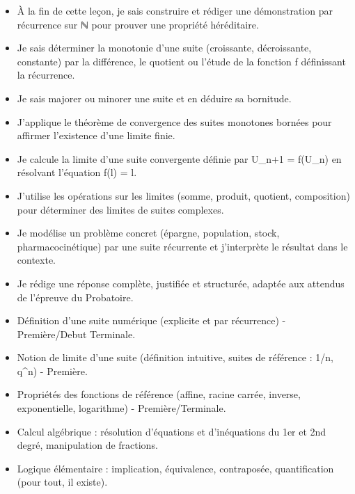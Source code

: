 \documentclass[11pt]{article}
\begin{document}
\begin{objectifs}
\begin{itemize}
\item À la fin de cette leçon, je sais construire et rédiger une démonstration par récurrence sur ℕ pour prouver une propriété héréditaire.
\item Je sais déterminer la monotonie d'une suite (croissante, décroissante, constante) par la différence, le quotient ou l'étude de la fonction f définissant la récurrence.
\item Je sais majorer ou minorer une suite et en déduire sa bornitude.
\item J'applique le théorème de convergence des suites monotones bornées pour affirmer l'existence d'une limite finie.
\item Je calcule la limite d'une suite convergente définie par U\_{n+1} = f(U\_n) en résolvant l'équation f(l) = l.
\item J'utilise les opérations sur les limites (somme, produit, quotient, composition) pour déterminer des limites de suites complexes.
\item Je modélise un problème concret (épargne, population, stock, pharmacocinétique) par une suite récurrente et j'interprète le résultat dans le contexte.
\item Je rédige une réponse complète, justifiée et structurée, adaptée aux attendus de l'épreuve du Probatoire.
\end{itemize}
\end{objectifs}

\begin{prerequis}
\begin{itemize}
\item Définition d'une suite numérique (explicite et par récurrence) - Première/Debut Terminale.
\item Notion de limite d'une suite (définition intuitive, suites de référence : 1/n, q\^{}n) - Première.
\item Propriétés des fonctions de référence (affine, racine carrée, inverse, exponentielle, logarithme) - Première/Terminale.
\item Calcul algébrique : résolution d'équations et d'inéquations du 1er et 2nd degré, manipulation de fractions.
\item Logique élémentaire : implication, équivalence, contraposée, quantification (pour tout, il existe).
\end{itemize}
\end{prerequis}
\end{document}
